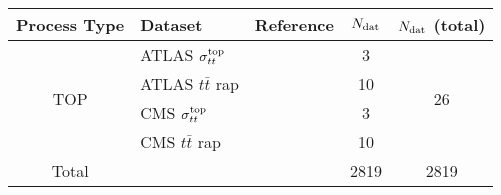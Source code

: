 \begin{center}
  \renewcommand*{\arraystretch}{1.50}
  \small
\begin{tabular}{|c|l|c|c|c|}
\toprule
  Process Type & Dataset   &  Reference    &  $N_{\rm dat}$     & $N_{\rm dat}$ (total)      \\
\midrule
\multirow{4}{*}{TOP}     &
ATLAS $\sigma_{tt}^{\rm top}$       & \cite{Aad:2014kva, Aaboud:2016pbd}  & 3  & \multirow{4}{*}{26}  \\
& ATLAS $t\bar{t}$ rap &  \cite{Aad:2015mbv} & 10   &\\
& CMS $\sigma_{tt}^{\rm top}$   & \cite{Khachatryan:2016mqs, Khachatryan:2015uqb}       &  3 &   \\
& CMS $t\bar{t}$ rap   & \cite{Khachatryan:2015oqa}& 10   &   \\
\bottomrule
Total    &         &        & 2819  &  2819  \\
\bottomrule
\end{tabular}
\end{center}
